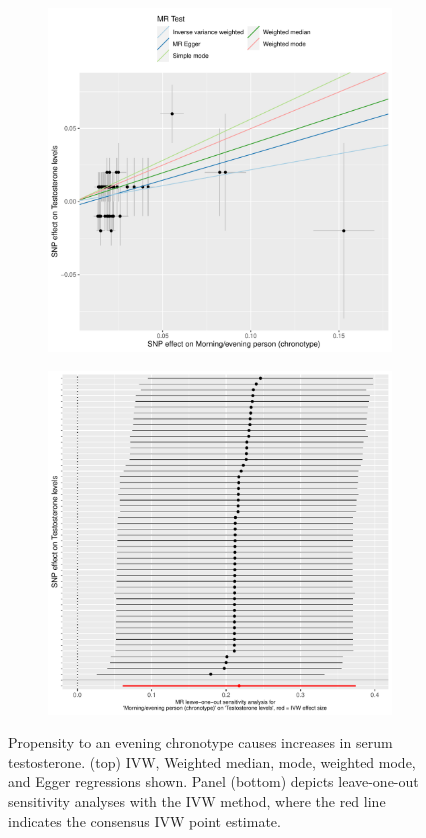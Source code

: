 \documentclass{article}
\begin{document}
\begin{figure}[htbp]
\begin{subfigure}{\linewidth}
\centering
	\includegraphics[width=.8\linewidth]{Figs/Analysis2/Morning_evening_person_(chronotype)_vs_Testosterone_levels.Scatterplots.pdf}
\label{testScatter}
\end{subfigure}
\begin{subfigure}{\linewidth}
\centering
	\includegraphics[width=.8\linewidth,keepaspectratio]{Figs/Analysis2/Morning_evening_person_(chronotype)_vs_Testosterone_levels.LOOplots.pdf}
\label{testLoo}
\end{subfigure}
\caption{Propensity to an evening chronotype causes increases in serum testosterone. (top) IVW, Weighted median, mode, weighted mode, and Egger regressions shown. Panel (bottom) depicts leave-one-out sensitivity analyses with the IVW method, where the red line indicates the consensus IVW point estimate.}
\label{test}
\end{figure}
\end{document}
